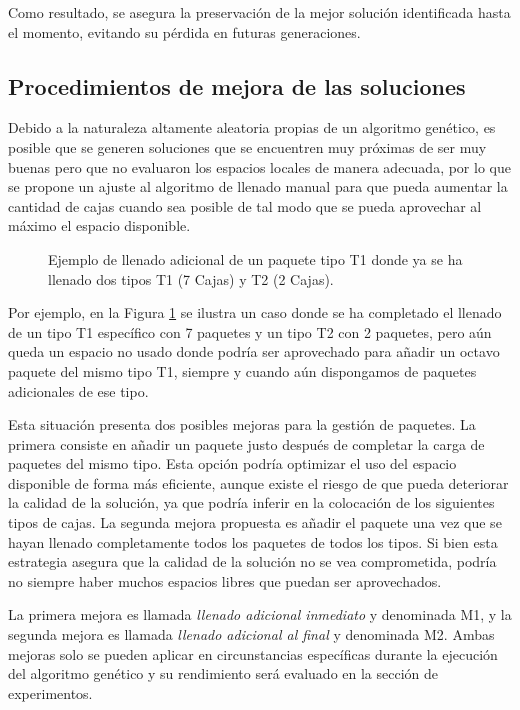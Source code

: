 \documentclass[openany]{article}
\begin{document}
Como resultado, se asegura la preservación de la mejor solución identificada hasta el momento, evitando su pérdida en futuras generaciones.

\subsection{Procedimientos de mejora de las soluciones}

Debido a la naturaleza altamente aleatoria propias de un algoritmo genético, es posible que se generen soluciones que se encuentren muy próximas de ser muy buenas pero que no evaluaron los espacios locales de manera adecuada, por lo que se propone un ajuste al algoritmo de llenado manual para que pueda aumentar la cantidad de cajas cuando sea posible de tal modo que se pueda aprovechar al máximo el espacio disponible.

\begin{figure}[H]
    \centering
    
    \caption{Ejemplo de llenado adicional de un paquete tipo T1 donde ya se ha llenado dos tipos T1 (7 Cajas) y T2 (2 Cajas).}
    \label{fig:llenado_adicional}
\end{figure}

Por ejemplo, en la Figura \ref{fig:llenado_adicional} se ilustra un caso donde se ha completado el llenado de un tipo T1 específico con 7 paquetes y un tipo T2 con 2 paquetes, pero aún queda un espacio no usado donde podría ser aprovechado para añadir un octavo paquete del mismo tipo T1, siempre y cuando aún dispongamos de paquetes adicionales de ese tipo.

Esta situación presenta dos posibles mejoras para la gestión de paquetes. La primera consiste en añadir un paquete justo después de completar la carga de paquetes del mismo tipo. Esta opción podría optimizar el uso del espacio disponible de forma más eficiente, aunque existe el riesgo de que pueda deteriorar la calidad de la solución, ya que podría inferir en la colocación de los siguientes tipos de cajas. La segunda mejora propuesta es añadir el paquete una vez que se hayan llenado completamente todos los paquetes de todos los tipos. Si bien esta estrategia asegura que la calidad de la solución no se vea comprometida, podría no siempre haber muchos espacios libres que puedan ser aprovechados.

La primera mejora es llamada \textit{llenado adicional inmediato} y denominada M1, y la segunda mejora es llamada \textit{llenado adicional al final} y denominada  M2. Ambas mejoras solo se pueden aplicar en circunstancias específicas durante la ejecución del algoritmo genético y su rendimiento será evaluado en la sección de experimentos.
\end{document}
